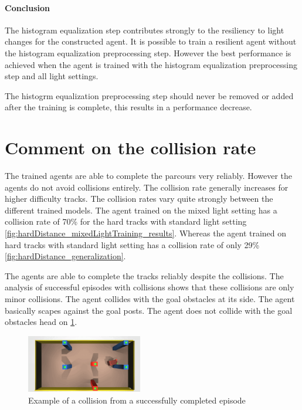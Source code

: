 \paragraph{Conclusion}
The histogram equalization step contributes strongly to the resiliency to light changes for the constructed agent. It is possible to train a resilient agent without the histogram equalization preprocessing step.
However the best performance is achieved when the agent is trained with the histogram equalization preprocessing step and all light settings.

The histogrm equalization preprocessing step should never be removed or added after the training is complete, this results in a performance decrease.

\section{Comment on the collision rate}

The trained agents are able to complete the parcours very reliably. However the agents do not avoid collisions entirely. The collision rate generally increases for higher difficulty tracks. The collision rates vary quite strongly between the different trained models. The agent trained on the mixed light setting has a collision rate of 70\% for the hard tracks with standard light setting \ref{fig:hardDistance_mixedLightTraining_results}. Whereas the agent trained on hard tracks with standard light setting has a collision rate of only 29\% \ref{fig:hardDistance_generalization}.

The agents are able to complete the tracks reliably despite the collisions. The analysis of successful episodes with collisions shows that these collisions are only minor collisions. The agent collides with the goal obstacles at its side. The agent basically scapes against the goal posts. The agent does not collide with the goal obstacles head on \ref{fig:example_collision}.

\begin{figure}
    \centering
    \includegraphics[width=0.45\textwidth]{Bilder/example_minor_collision_topview_frame_1295.png}
    \caption{Example of a collision from a successfully completed episode}
    \label{fig:example_collision}
\end{figure}

